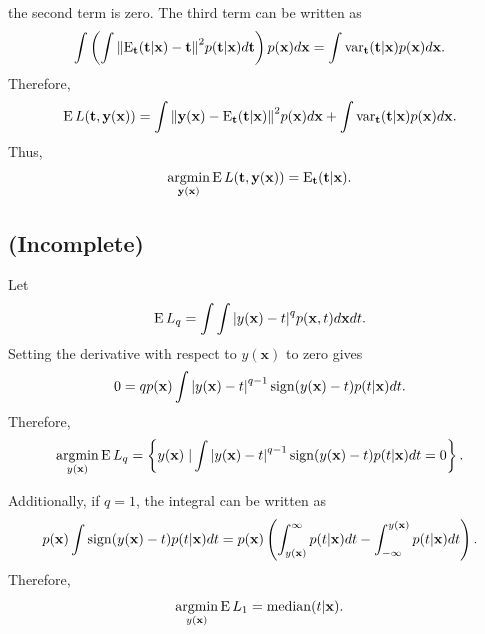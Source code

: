 %
the second term is zero.
The third term can be written as
%
\begin{equation}
\int 
\left( 
	\int 
	\norm{\operatorname{E}_\mathbf{t} (\mathbf{t} | \mathbf{x}) - \mathbf{t}} ^ 2 
	p(\mathbf{t} | \mathbf{x}) 
	d\mathbf{t} 
\right) 
p(\mathbf{x}) 
d\mathbf{x} 
= 
\int 
\operatorname{var}_{\mathbf{t}} (\mathbf{t} | \mathbf{x}) 
p(\mathbf{x}) 
d\mathbf{x}.
\end{equation}
%
Therefore,
%
\begin{equation}
\operatorname{E} L(\mathbf{t}, \mathbf{y} (\mathbf{x})) 
= 
\int 
\norm{\mathbf{y}(\mathbf{x}) - \operatorname{E}_\mathbf{t} (\mathbf{t} | \mathbf{x})} ^ 2 p(\mathbf{x}) 
d\mathbf{x} 
+ 
\int 
\operatorname{var}_{\mathbf{t}} (\mathbf{t} | \mathbf{x}) p(\mathbf{x}) 
d\mathbf{x}.
\end{equation}
%
Thus, 
%
\begin{equation}
\operatorname*{arg min}_{\mathbf{y}(\mathbf{x})} 
\operatorname{E} L(\mathbf{t}, \mathbf{y} (\mathbf{x}))
= 
\operatorname{E}_\mathbf{t} (\mathbf{t} | \mathbf{x}).
\end{equation}


\subsection{(Incomplete)}
\label{1.27}
Let
%
\begin{equation}
\operatorname{E} L_q 
= 
\int 
\int 
\abs{y(\mathbf{x}) - t} ^ q 
p(\mathbf{x}, t) 
d\mathbf{x} 
dt.
\end{equation}
%
Setting the derivative with respect to $y(\mathbf{x})$ to zero gives
%
\begin{equation}
0 
= 
q
p(\mathbf{x})
\int  
\abs{y(\mathbf{x}) - t} ^ {q - 1} 
\operatorname{sign}(y(\mathbf{x}) - t) 
p(t | \mathbf{x}) 
dt.
\end{equation}
%
Therefore,
%
\begin{equation}
\operatorname*{arg min}_{y(\mathbf{x})}
\operatorname{E} L_q
=
\left \{
	y(\mathbf{x})
	\left.
	\right \vert
	\int  
	\abs{y(\mathbf{x}) - t} ^ {q - 1} 
	\operatorname{sign}(y(\mathbf{x}) - t) 
	p(t | \mathbf{x}) 
	dt
	=
	0
\right \}.
\end{equation}
%

Additionally, if $q = 1$, the integral can be written as
%
\begin{equation}
p(\mathbf{x})
\int
\operatorname{sign}(y(\mathbf{x}) - t)
p(t | \mathbf{x})
dt
=
p(\mathbf{x})
\left(
	\int_{y(\mathbf{x})}^{\infty} 
	p(t | \mathbf{x}) 
	dt 
	- 
	\int_{- \infty}^{y(\mathbf{x})}
	p(t | \mathbf{x}) 
	dt
\right).
\end{equation}
%
Therefore, 
%
\begin{equation}
\operatorname*{arg min}_{y(\mathbf{x})}
\operatorname{E} L_1
=
\operatorname{median} (t | \mathbf{x}).
\end{equation}
%

